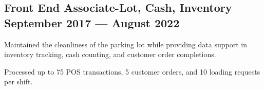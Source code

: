 \subsection{{Front End Associate-Lot, Cash, Inventory \hfill September 2017 --- August 2022}}
\begin{zitemize}
\item Maintained the cleanliness of the parking lot while providing data support in inventory tracking, cash counting, and customer order completions.
\item Processed up to 75 POS transactions, 5 customer orders, and 10 loading requests  per shift.
\end{zitemize}
